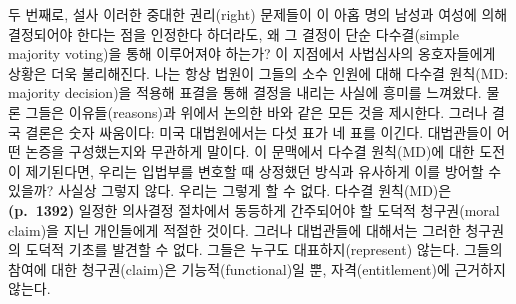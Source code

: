 \documentclass[a4paper,12pt,oneside]{article}  %
\begin{document}
두 번째로, 설사 이러한 중대한 권리(right) 문제들이 이 아홉 명의 남성과
여성에 의해 결정되어야 한다는 점을 인정한다 하더라도, 왜 그 결정이 단순
다수결(simple majority voting)을 통해 이루어져야 하는가? 이 지점에서
사법심사의 옹호자들에게 상황은 더욱 불리해진다. 나는 항상 법원이 그들의
소수 인원에 대해 다수결 원칙(MD: majority decision)을 적용해 표결을 통해
결정을 내리는 사실에 흥미를 느껴왔다. 물론 그들은 이유들(reasons)과
위에서 논의한 바와 같은 모든 것을 제시한다. 그러나 결국 결론은 숫자
싸움이다: 미국 대법원에서는 다섯 표가 네 표를 이긴다. 대법관들이 어떤
논증을 구성했는지와 무관하게 말이다. 이 문맥에서 다수결 원칙(MD)에 대한
도전이 제기된다면, 우리는 입법부를 변호할 때 상정했던 방식과 유사하게
이를 방어할 수 있을까? 사실상 그렇지 않다. 우리는 그렇게 할 수 없다.
다수결 원칙(MD)은 \textbf{(p.~1392)} 일정한 의사결정 절차에서 동등하게
간주되어야 할 도덕적 청구권(moral claim)을 지닌 개인들에게 적절한
것이다. 그러나 대법관들에 대해서는 그러한 청구권의 도덕적 기초를 발견할
수 없다. 그들은 누구도 대표하지(represent) 않는다. 그들의 참여에 대한
청구권(claim)은 기능적(functional)일 뿐, 자격(entitlement)에 근거하지
않는다.
\end{document}
